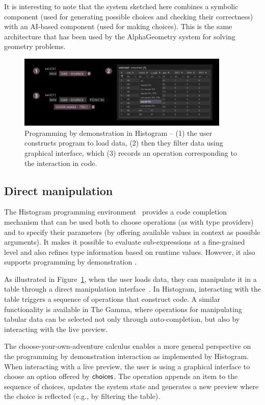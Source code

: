 \documentclass[anonymous, a4paper,UKenglish,cleveref, autoref, thm-restate]{lipics-v2021}
\newcommand{\ident}[1]{\textsf{#1}}
\newcommand{\choices}{\textnormal{\ident{choices}}}
\begin{document}
It is interesting to note that the system sketched here combines a symbolic component (used for generating
possible choices and checking their correctness) with an AI-based component (used for
making choices). This is the same architecture that has been used by the Alpha\-Geometry
system \cite{trinh-2024-alphageometry} for solving geometry problems.

\begin{figure}[t]
  \includegraphics[width=0.9\textwidth]{fig/histogram.png}
  \caption{Programming by demonstration in Histogram -- (1) the user constructs program to load
    data, (2) then they filter data using graphical interface, which (3) records an operation
    corresponding to the interaction in code.}
  \label{fig:histogram}
\end{figure}

\subsection{Direct manipulation}

The Histogram programming environment~\cite{petricek-2019-histogram} provides a code completion
mechanism that can be used both to choose operations (as with type providers) and to specify
their parameters (by offering available values in context as possible arguments). It makes it
possible to evaluate sub-expressions at a fine-grained level and also refines type information
based on runtime values. However, it also supports programming by demonstration
\cite{cypher-1993-pbd,kandel-2011-wrangler}.

As illustrated in Figure~\ref{fig:histogram}, when the user loads data, they can manipulate it
in a table through a direct manipulation interface~\cite{shneiderman-1983-direct}. In Histogram,
interacting with the table triggers a sequence of operations that construct code. A similar
functionality is available in The Gamma, where operations for manipulating tabular data can be
selected not only through auto-completion, but also by interacting with the live preview.

The choose-your-own-adventure calculus enables a more general perspective on the programming
by demonstration interaction as implemented by Histogram. When interacting with a live
preview, the user is using a graphical interface to choose an option offered by $\choices$.
The operation appends an item to the sequence of choices, updates the system state
and generates a new preview where the choice is reflected (e.g., by filtering the table).
\end{document}
